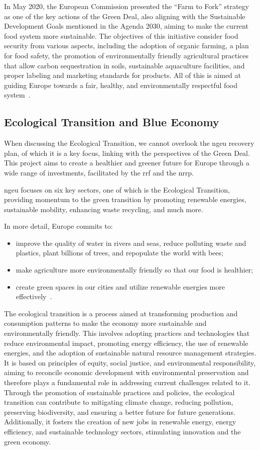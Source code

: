 In May 2020, the European Commission presented the “Farm to Fork” strategy as one of the key actions of the Green Deal, also aligning with the Sustainable Development Goals mentioned in the Agenda 2030, aiming to make the current food system more sustainable. The objectives of this initiative consider food security from various aspects, including the adoption of organic farming, a plan for food safety, the promotion of environmentally friendly agricultural practices that allow carbon sequestration in soils, sustainable aquaculture facilities, and proper labeling and marketing standards for products. All of this is aimed at guiding Europe towards a fair, healthy, and environmentally respectful food system~\parencite{farm_to_fork}.


\subsection{Ecological Transition and Blue Economy}
When discussing the Ecological Transition, we cannot overlook the \gls{ngeu} recovery plan, of which it is a key focus, linking with the perspectives of the Green Deal. This project aims to create a healthier and greener future for Europe through a wide range of investments, facilitated by the \gls{rrf} and the \gls{nrrp}.

\gls{ngeu} focuses on six key sectors, one of which is the Ecological Transition, providing momentum to the green transition by promoting renewable energies, sustainable mobility, enhancing waste recycling, and much more.

In more detail, Europe commits to:
\begin{itemize}
\item improve the quality of water in rivers and seas, reduce polluting waste and plastics, plant billions of trees, and repopulate the world with bees;
\item make agriculture more environmentally friendly so that our food is healthier;
\item create green spaces in our cities and utilize renewable energies more effectively~\parencite{next_gen_eu}.
\end{itemize}

The ecological transition is a process aimed at transforming production and consumption patterns to make the economy more sustainable and environmentally friendly. This involves adopting practices and technologies that reduce environmental impact, promoting energy efficiency, the use of renewable energies, and the adoption of sustainable natural resource management strategies. It is based on principles of equity, social justice, and environmental responsibility, aiming to reconcile economic development with environmental preservation and therefore plays a fundamental role in addressing current challenges related to it. Through the promotion of sustainable practices and policies, the ecological transition can contribute to mitigating climate change, reducing pollution, preserving biodiversity, and ensuring a better future for future generations. Additionally, it fosters the creation of new jobs in renewable energy, energy efficiency, and sustainable technology sectors, stimulating innovation and the green economy.

